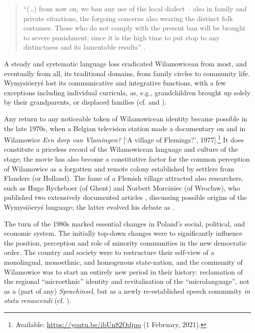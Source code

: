\documentclass[output=paper]{langscibook}
\begin{document}
\begin{quote}
    “(\ldots) from now on, we ban any use of the local dialect – also in family and private situations, the forgoing concerns also wearing the distinct folk costumes. Those who do not comply with the present ban will be brought to severe punishment; since it is the high time to put stop to any distinctness and its lamentable results” \citep[183--184]{filip_flamandowie_2005}.
\end{quote}

A steady and systematic language loss eradicated Wilamowicean from most, and eventually from all, its traditional domains, from family circles to community life. Wymysiöeryś lost its communicative and integrative functions, with a few exceptions including individual curricula, as, e.g., grandchildren brought up solely by their grandparents, or displaced families (cf. \citealt{wicherkiewicz_impact_1993} and \citealt{wicherkiewicz_researching_2016}).

Any return to any noticeable token of Wilamowicean identity became possible in the late 1970s, when a Belgian television station made a documentary on and in Wilamowice \textit{Een dorp van Vlamingen?} [‘A village of Flemings?’, 1977].\footnote{Available: \url{https://youtu.be/ibUn82Odjpo} (1 February, 2021).} It does constitute a priceless record of the Wilamowicean language and culture of the stage; the movie has also become a constitutive factor for the common perception of Wilamowice as a forgotten and remote colony established by settlers from Flanders (or Holland). The fame of a Flemish village attracted also researchers, such as Hugo Ryckeboer (of Ghent) and Norbert Morciniec (of Wrocław), who published two extensively documented articles \citep{ryckeboer_flamen_1984, morciniec_flamische_1984}, discussing possible origins of the Wymysiöeryś language; the latter evolved his debate as \citet{morciniec_stellung_1995}.

The turn of the 1980s marked essential changes in Poland’s social, political, and economic system. The initially top-down changes were to significantly influence the position, perception and role of minority communities in the new democratic order. The country and society were to restructure their self-view of a monolingual, monoethnic, and homogenous state-nation, and the community of Wilamowice was to start an entirely new period in their history: reclamation of the regional “microethnic” identity and revitalisation of the “microlanguage”, not as a (part of any) \textit{Sprachinsel}, but as a newly re-established speech community \textit{in statu renascendi} (cf. \citealt{wicherkiewicz_awakening_2018}).
\end{document}
